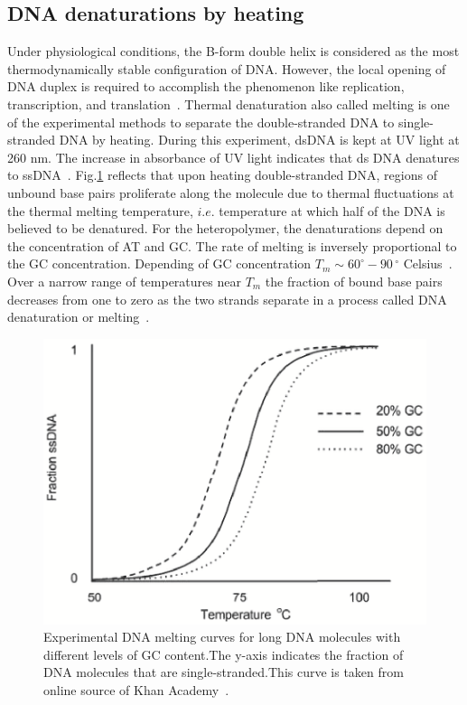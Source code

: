 \documentclass[12pt,masters,final]{UTRGVthesis}
\begin{document}
\subsection{DNA denaturations by heating}
Under physiological conditions, the B-form double helix is considered as the most thermodynamically stable configuration of DNA. However, the local opening of DNA duplex is required to accomplish the phenomenon like replication, transcription, and translation~\cite{Alberts:2015}. Thermal denaturation also called melting is one of the experimental methods to separate the double-stranded DNA to single-stranded  DNA by heating. During this experiment, dsDNA is kept at UV light at 260 nm. The increase in absorbance of UV light indicates that ds DNA denatures to ssDNA~\cite{peyrard2004nonlinear,dauxois1995entropy}. Fig.\ref{fig:DNA thermal melting} reflects that upon heating double-stranded DNA, regions of unbound base pairs proliferate along the molecule due to thermal fluctuations at the thermal melting temperature, $ i.e.$ temperature at which half of the DNA is believed to be denatured. For the heteropolymer, the denaturations depend on the concentration of AT and GC. The rate of melting is inversely proportional to the GC concentration. Depending of GC concentration $T_m \sim 60^{\circ} - 90$\,$^{\circ}$ Celsius~\cite{DB:1991}. Over a narrow range of temperatures near $T_m$ the fraction of bound base pairs decreases from one to zero as the two strands separate
in a process called DNA denaturation or melting~\cite{Wartell:1985}.
\begin{figure}[!h]
  \includegraphics[width=0.65 \textwidth]{dna_thermal_melting.eps}
  \caption{\small Experimental DNA melting curves for long DNA molecules with different levels of GC content.The y-axis indicates the fraction of DNA molecules that are single-stranded.This curve is taken from online source of Khan Academy \,. }
  \label{fig:DNA thermal melting}
\end{figure}
%
\newpage
\end{document}
